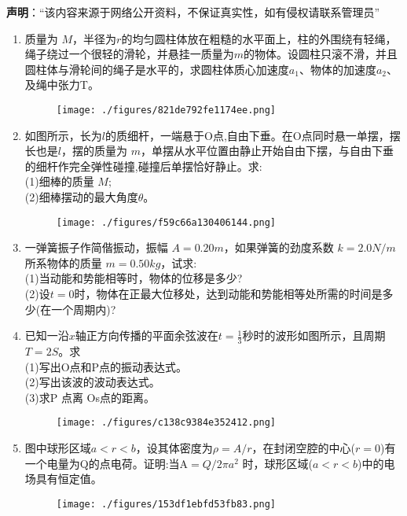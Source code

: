 \textbf{声明}：“该内容来源于网络公开资料，不保证真实性，如有侵权请联系管理员”


\begin{enumerate}
\item 质量为 $M$，半径为$r$的均匀圆柱体放在粗糙的水平面上，柱的外围绕有轻绳，绳子绕过一个很轻的滑轮，并悬挂一质量为$m $的物体。设圆柱只滚不滑，并且圆柱体与滑轮间的绳子是水平的，求圆柱体质心加速度$ a_1$、物体的加速度$ a_2$、及绳中张力T。
\begin{figure}[ht]
\centering
\texttt{[image: ./figures/821de792fe1174ee.png]}
\caption{} \label{fig_SD05_1}
\end{figure}
\item 如图所示，长为$l$的质细杆，一端悬于O点,自由下垂。在O点同时悬一单摆，摆长也是$l$，摆的质量为 $m$，单摆从水平位置由静止开始自由下摆，与自由下垂的细杆作完全弹性碰撞,碰撞后单摆恰好静止。求:\\
(1)细棒的质量 $M;$\\
(2)细棒摆动的最大角度$\theta$。
\begin{figure}[ht]
\centering
\texttt{[image: ./figures/f59c66a130406144.png]}
\caption{} \label{fig_SD05_2}
\end{figure}
\item 一弹簧振子作简偕振动，振幅 $A=0.20m$，如果弹簧的劲度系数 $k=2.0N/m$所系物体的质量 $m=0.50kg$，试求:\\
(1)当动能和势能相等时，物体的位移是多少?\\
(2)设$t=0$时，物体在正最大位移处，达到动能和势能相等处所需的时间是多少(在一个周期内)?
\item 已知一沿$x$轴正方向传播的平面余弦波在$t=\frac{1}{3}$秒时的波形如图所示，且周期$T=2S$。求\\
(1)写出O点和P点的振动表达式。\\
(2)写出该波的波动表达式。\\
(3)求P 点离 Os点的距离。
\begin{figure}[ht]
\centering
\texttt{[image: ./figures/c138c9384e352412.png]}
\caption{} \label{fig_SD05_3}
\end{figure}
\item 图中球形区域$a<r<b$，设其体密度为$\rho=A/r$，在封闭空腔的中心($r=0$)有一个电量为Q的点电荷。证明:当A$=Q/2\pi a^2$ 时，球形区域($a<r<b$)中的电场具有恒定值。
\begin{figure}[ht]
\centering
\texttt{[image: ./figures/153df1ebfd53fb83.png]}
\caption{} \label{fig_SD05_4}

\end{figure}
\end{enumerate}
